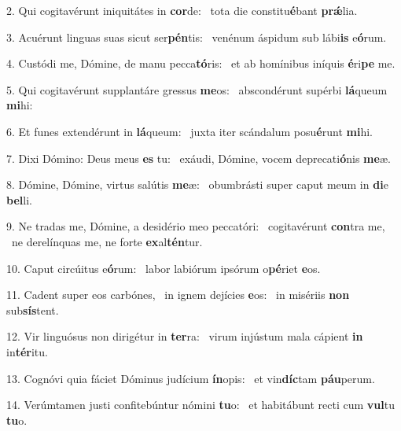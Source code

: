 2. Qui cogitavérunt iniquitátes in \textbf{cor}de: \ast\  tota die constitu\textbf{é}bant \textbf{prǽ}lia.\

3. Acuérunt linguas suas sicut ser\textbf{pén}tis: \ast\  venénum áspidum sub lábi\textbf{is} e\textbf{ó}rum.\

4. Custódi me, Dómine, de manu pecca\textbf{tó}ris: \ast\  et ab homínibus iníquis \textbf{é}ri\textbf{pe} me.\

5. Qui cogitavérunt supplantáre gressus \textbf{me}os: \ast\  abscondérunt supérbi \textbf{lá}queum \textbf{mi}hi:\

6. Et funes extendérunt in \textbf{lá}queum: \ast\  juxta iter scándalum posu\textbf{é}runt \textbf{mi}hi.\

7. Dixi Dómino: Deus meus \textbf{es} tu: \ast\  exáudi, Dómine, vocem deprecati\textbf{ó}nis \textbf{me}æ.\

8. Dómine, Dómine, virtus salútis \textbf{me}æ: \ast\  obumbrásti super caput meum in \textbf{di}e \textbf{bel}li.\

9. Ne tradas me, Dómine, a desidério meo peccatóri: \dag\  cogitavérunt \textbf{con}tra me, \ast\  ne derelínquas me, ne forte \textbf{ex}al\textbf{tén}tur.\

10. Caput circúitus e\textbf{ó}rum: \ast\  labor labiórum ipsórum o\textbf{pé}riet \textbf{e}os.\

11. Cadent super eos carbónes, \dag\  in ignem dejícies \textbf{e}os: \ast\  in misériis \textbf{non} sub\textbf{sís}tent.\

12. Vir linguósus non dirigétur in \textbf{ter}ra: \ast\  virum injústum mala cápient \textbf{in} in\textbf{tér}itu.\

13. Cognóvi quia fáciet Dóminus judícium \textbf{ín}opis: \ast\  et vin\textbf{díc}tam \textbf{páu}perum.\

14. Verúmtamen justi confitebúntur nómini \textbf{tu}o: \ast\  et habitábunt recti cum \textbf{vul}tu \textbf{tu}o.\

